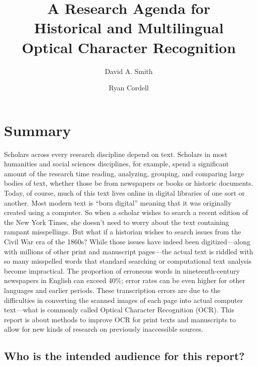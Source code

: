 \documentclass[twoside,11pt]{report}
\title{\Huge A Research Agenda for \\ Historical and Multilingual \\ Optical Character Recognition}
\author{\huge David A. Smith \and \huge Ryan Cordell}
\date{}
\begin{document}
\maketitle

\tableofcontents

\chapter{Summary}
\label{sec:summary}

Scholars across every research discipline depend on text. Scholars in most humanities and social sciences disciplines, for example, spend a significant amount of the research time reading, analyzing, grouping, and comparing large bodies of text, whether those be from newspapers or books or historic documents. Today, of course, much of this text lives online in digital libraries of one sort or another. Most modern text is ``born digital'' meaning that it was originally created using a computer. So when a scholar wishes to search a recent edition of the New York Times, she doesn't need to worry about the text containing rampant misspellings. But what if a historian wishes to search issues from the Civil War era of the 1860s? While those issues have indeed been digitized---along with millions of other print and manuscript pages---the actual text is riddled with so many misspelled words that standard searching or computational text analysis become impractical. The proportion of erroneous words in nineteenth-century newspapers in English can exceed 40\%; error rates can be even higher for other languages and earlier periods. These transcription errors are due to the difficulties in converting the scanned images of each page into actual computer text---what is commonly called Optical Character Recognition (OCR). This report is about methods to improve OCR for print texts and manuscripts to allow for new kinds of research on previously inaccessible sources.

\section{Who is the intended audience for this report?}
\end{document}

